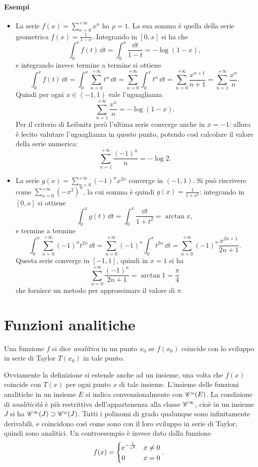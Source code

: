 \paragraph{Esempi}
\begin{itemize}
\item La serie $f(x)=\sum_{n=0}^{+\infty}x^n$ ha $\rho=1$. La sua somma è quella della serie geometrica $f(x)=\frac1{1-x}$. Integrando in $[0,x]$ si ha che
\[
\int_0^xf(t)\,\dd t=\int_0^x\frac{\dd t}{1-t}=-\log(1-x),
\]
e integrando invece termine a termine si ottiene
\[
\int_0^xf(t)\,\dd t=\int_0^x\sum_{n=0}^{+\infty}t^n\,\dd t=\sum_{n=0}^{+\infty}\int_0^xt^n\,\dd t=\sum_{n=0}^{+\infty}\frac{x^{n+1}}{n+1}=\sum_{n=1}^{+\infty}\frac{x^n}{n}.
\]
Quindi per ogni $x\in(-1,1)$ vale l'uguaglianza
\[
\sum_{n=1}^{+\infty}\frac{x^n}{n}=-\log(1-x).
\]
Per il criterio di Leibnitz però l'ultima serie converge anche in $x=-1$: allora è lecito valutare l'uguaglianza in questo punto, potendo così calcolare il valore della serie numerica:
\[
\sum_{n=1}^{+\infty}\frac{(-1)^n}{n}=-\log 2.
\]
\item La serie $g(x)=\sum_{n=0}^{+\infty}(-1)^nx^{2n}$ converge in $(-1,1)$. Si può riscrivere come $\sum_{n=0}^{+\infty}(-x^2)^n$, la cui somma è quindi $g(x)=\frac1{1+x^2}$: integrando in $[0,x]$ si ottiene
\[
\int_0^xg(t)\,\dd t=\int_0^x\frac{\dd t}{1+t^2}=\arctan x,
\]
e termine a termine
\[
\int_0^x\sum_{n=0}^{+\infty}(-1)^nt^{2n}\,\dd t=\sum_{n=0}^{+\infty}(-1)^n\int_0^xt^{2n}\,\dd t=\sum_{n=0}^{+\infty}(-1)^n\frac{x^{2n+1}}{2n+1}.
\]
Questa serie converge in $[-1,1]$, quindi in $x=1$ si ha
\[
\sum_{n=0}^{+\infty}\frac{(-1)^n}{2n+1}=\arctan 1=\frac{\pi}4
\]
che fornisce un metodo per approssimare il valore di $\pi$.
\end{itemize}

\section{Funzioni analitiche}
\begin{definizione}
Una funzione $f$ si dice \emph{analitica} in un punto $x_0$ se $f(x_0)$ coincide con lo sviluppo in serie di Taylor $T(x_0)$ in tale punto.
\end{definizione}
Ovviamente la definizione si estende anche ad un insieme, una volta che $f(x)$ coincide con $T(x)$ per ogni punto $x$ di tale insieme.
L'insieme delle funzioni analitiche in un insieme $E$ si indica convenzionalmente con $\cont[\omega]{E}$. La condizione di \emph{analiticità} è più restrittiva dell'appartenenza alla classe $\cclass[\infty]$, cioè in un insieme $J$ si ha $\cont[\infty]{J}\supset\cont[\omega]{J}$.
Tutti i polinomi di grado qualunque sono infinitamente derivabili, e coincidono così come sono con il loro sviluppo in serie di Taylor, quindi sono analitici. Un controesempio è invece dato dalla funzione
\[
f(x)=\begin{dcases}e^{-\frac1{x^2}}&x\neq 0\\0&x=0\end{dcases}.
\]

